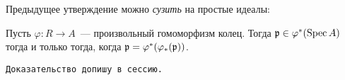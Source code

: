 	Предыдущее утверждение можно \emph{сузить} на простые идеалы:
	\begin{lemma} 
		Пусть $\varphi\colon R \to A$~--- произвольный гомоморфизм колец. Тогда $\fp \in \varphi^{*}\lr*{\Spec{A}}$ тогда и только тогда, когда $\mathfrak{p} = \varphi^{*}(\varphi_{*}(\mathfrak{p}))$.
	\end{lemma}

	\texttt{Доказательство допишу в сессию.}




